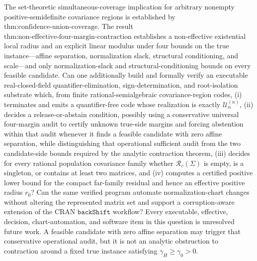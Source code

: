 The set-theoretic simultaneous-coverage implication for arbitrary nonempty positive-semidefinite covariance regions is established by \(\text{thm:confidence-union-coverage}\). The result \(\text{thm:non-effective-four-margin-contraction}\) establishes a non-effective existential local radius and an explicit linear modulus under four bounds on the true instance---affine separation, normalization slack, structural conditioning, and scale---and only normalization-slack and structural-conditioning bounds on every feasible candidate. Can one additionally build and formally verify an executable real-closed-field quantifier-elimination, sign-determination, and root-isolation substrate which, from finite rational-semialgebraic covariance-region codes, (i) terminates and emits a quantifier-free code whose realization is exactly \(\mathcal U^{(n)}_\alpha\), (ii) decides a release-or-abstain condition, possibly using a conservative universal four-margin audit to certify unknown true-side margins and forcing abstention within that audit whenever it finds a feasible candidate with zero affine separation, while distinguishing that operational sufficient audit from the two candidate-side bounds required by the analytic contraction theorem, (iii) decides for every rational population covariance family whether \(\mathcal R_c(\Sigma)\) is empty, is a singleton, or contains at least two matrices, and (iv) computes a certified positive lower bound for the compact far-family residual and hence an effective positive radius \(r_0\)? Can the same verified program automate normalization-chart changes without altering the represented matrix set and support a corruption-aware extension of the CRAN \(\texttt{backShift}\) workflow? Every executable, effective, decision, chart-automation, and software item in this question is unresolved future work. A feasible candidate with zero affine separation may trigger that conservative operational audit, but it is not an analytic obstruction to contraction around a fixed true instance satisfying \(\gamma_H\geq\gamma_0>0\).